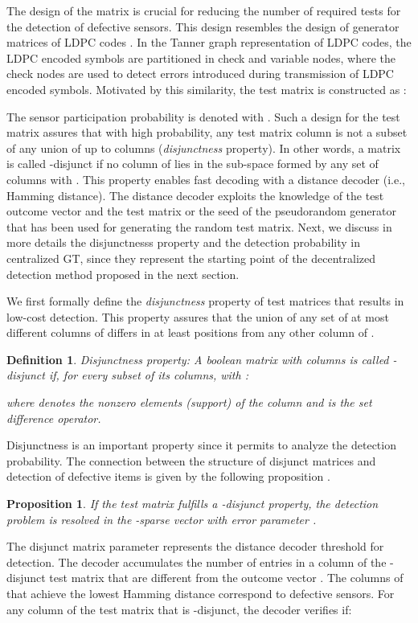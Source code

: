 \documentclass[journal]{IEEEtran}
\newtheorem{prop}{Proposition}
\newtheorem{defin}{Definition}
\begin{document}
The design of the matrix  is crucial for reducing the number of required tests for the detection of defective sensors. This design resembles the design of generator matrices of LDPC codes \cite{Gallager:62}. In the Tanner graph representation of LDPC codes, the LDPC encoded symbols are partitioned in check and variable nodes, where the check nodes are used to detect errors introduced during transmission of LDPC encoded symbols. Motivated by this similarity, the test matrix  is constructed as \cite{Cheraghchi:11}:

The sensor participation probability is denoted with . Such a design for the test matrix assures that with high probability, any test matrix column is not a subset of any union of up to  columns (\textit{disjunctness} property). In other words, a matrix  is called -disjunct if no column  of  lies in the sub-space formed by any set of  columns  with . This property enables fast decoding with a distance decoder (i.e., Hamming distance). 
The distance decoder exploits the knowledge of the test outcome vector  and the test matrix or the seed of the pseudorandom generator that has been used for generating the random test matrix. Next, we discuss in more details the disjunctnesss property and the detection probability in centralized GT, since they represent the starting point of the decentralized detection method proposed in the next section.

We first formally define the \textit{disjunctness} property \cite{Cheraghchi:11} of test matrices that results in low-cost detection. This property assures that the union of any set of at most  different columns of  differs in at least  positions from any other column of . 
\begin{defin}
\label{def:disjunct}
\textit{Disjunctness property}: A boolean matrix  with  columns  is called -disjunct if, for every subset  of its columns, with :

where  denotes the nonzero elements (support) of the column  and  is the set difference operator. 
\end{defin}


Disjunctness is an important property since it permits to analyze the detection probability. The connection between the structure of disjunct matrices and detection of defective items is given by the following proposition \cite{Cheraghchi:11}.
\begin{prop}
\label{def:noise_problem}
If the test matrix  fulfills a -disjunct property, the detection problem is resolved in the -sparse vector  with error parameter . 
\end{prop}
The disjunct matrix parameter  represents the distance decoder threshold for detection. The decoder accumulates the number of entries in a column of the -disjunct test matrix that are different from the outcome vector . The columns of  that achieve the lowest Hamming distance correspond to defective sensors. For any column  of the test matrix  that is -disjunct, the decoder verifies if:
\end{document}
